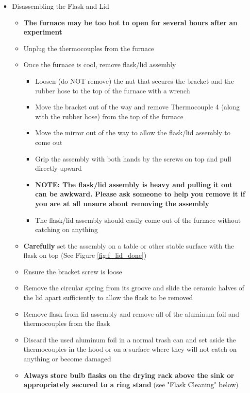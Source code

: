 \documentclass[letterpaper,11pt]{article}
\begin{document}
\begin{itemize}
    \item Disassembling the Flask and Lid
        \begin{itemize}
        \item \textbf{The furnace may be too hot to open for several hours after
             an experiment}
        \item Unplug the thermocouples from the furnace
        \item Once the furnace is cool, remove flask/lid assembly
            \begin{itemize}
            \item Loosen (do NOT remove) the nut that secures the bracket and 
                the rubber hose to the top of the furnace with a wrench
            \item Move the bracket out of the way and remove Thermocouple 4 
                (along with the rubber hose) from the top of the furnace
            \item Move the mirror out of the way to allow the flask/lid assembly
                to come out
            \item Grip the assembly with both hands by the screws on top and 
                pull directly upward
            \item \textbf{NOTE: The flask/lid assembly is heavy and pulling it  
                out can be awkward. Please ask someone to help you remove it 
                if you are at all unsure about removing the assembly}
            \item The flask/lid assembly should easily come out of the furnace 
                without catching on anything
            \end{itemize}
        
        \item \textbf{Carefully} set the assembly on a table or other stable 
            surface with the flask on top (See Figure \ref{fig:f_lid_done})
        \item Ensure the bracket screw is loose
        \item Remove the circular spring from its groove and slide the ceramic
            halves of the lid apart sufficiently to allow the flask to be 
            removed
        \item Remove flask from lid assembly and  remove all of the aluminum 
            foil and thermocouples from the flask
        \item Discard the used aluminum foil in a normal trash can and set 
            aside the thermocouples in the hood or on a surface where they will
            not catch on anything or become damaged
        \item \textbf{Always store bulb flasks on the drying rack above the sink 
            or appropriately secured to a ring stand} (see "Flask Cleaning"
             below)
        \end{itemize}


\end{itemize}
\end{document}
